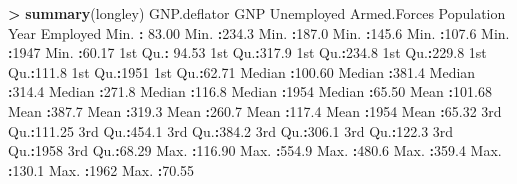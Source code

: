 \documentclass[]{book}
\newenvironment{Shaded}{\begin{snugshade}}{\end{snugshade}}
\newcommand{\KeywordTok}[1]{\textcolor[rgb]{0.13,0.29,0.53}{\textbf{#1}}}
\newcommand{\DecValTok}[1]{\textcolor[rgb]{0.00,0.00,0.81}{#1}}
\newcommand{\FloatTok}[1]{\textcolor[rgb]{0.00,0.00,0.81}{#1}}
\newcommand{\StringTok}[1]{\textcolor[rgb]{0.31,0.60,0.02}{#1}}
\newcommand{\OperatorTok}[1]{\textcolor[rgb]{0.81,0.36,0.00}{\textbf{#1}}}
\newcommand{\NormalTok}[1]{#1}
\begin{document}
\begin{Shaded}
\begin{Highlighting}[]
\OperatorTok{>}\StringTok{ }\KeywordTok{summary}\NormalTok{(longley)}
\NormalTok{  GNP.deflator         GNP          Unemployed     Armed.Forces     Population         Year         Employed    }
\NormalTok{ Min.   }\OperatorTok{:}\StringTok{ }\FloatTok{83.00}\NormalTok{   Min.   }\OperatorTok{:}\FloatTok{234.3}\NormalTok{   Min.   }\OperatorTok{:}\FloatTok{187.0}\NormalTok{   Min.   }\OperatorTok{:}\FloatTok{145.6}\NormalTok{   Min.   }\OperatorTok{:}\FloatTok{107.6}\NormalTok{   Min.   }\OperatorTok{:}\DecValTok{1947}\NormalTok{   Min.   }\OperatorTok{:}\FloatTok{60.17}  
\NormalTok{ 1st Qu.}\OperatorTok{:}\StringTok{ }\FloatTok{94.53}\NormalTok{   1st Qu.}\OperatorTok{:}\FloatTok{317.9}\NormalTok{   1st Qu.}\OperatorTok{:}\FloatTok{234.8}\NormalTok{   1st Qu.}\OperatorTok{:}\FloatTok{229.8}\NormalTok{   1st Qu.}\OperatorTok{:}\FloatTok{111.8}\NormalTok{   1st Qu.}\OperatorTok{:}\DecValTok{1951}\NormalTok{   1st Qu.}\OperatorTok{:}\FloatTok{62.71}  
\NormalTok{ Median }\OperatorTok{:}\FloatTok{100.60}\NormalTok{   Median }\OperatorTok{:}\FloatTok{381.4}\NormalTok{   Median }\OperatorTok{:}\FloatTok{314.4}\NormalTok{   Median }\OperatorTok{:}\FloatTok{271.8}\NormalTok{   Median }\OperatorTok{:}\FloatTok{116.8}\NormalTok{   Median }\OperatorTok{:}\DecValTok{1954}\NormalTok{   Median }\OperatorTok{:}\FloatTok{65.50}  
\NormalTok{ Mean   }\OperatorTok{:}\FloatTok{101.68}\NormalTok{   Mean   }\OperatorTok{:}\FloatTok{387.7}\NormalTok{   Mean   }\OperatorTok{:}\FloatTok{319.3}\NormalTok{   Mean   }\OperatorTok{:}\FloatTok{260.7}\NormalTok{   Mean   }\OperatorTok{:}\FloatTok{117.4}\NormalTok{   Mean   }\OperatorTok{:}\DecValTok{1954}\NormalTok{   Mean   }\OperatorTok{:}\FloatTok{65.32}  
\NormalTok{ 3rd Qu.}\OperatorTok{:}\FloatTok{111.25}\NormalTok{   3rd Qu.}\OperatorTok{:}\FloatTok{454.1}\NormalTok{   3rd Qu.}\OperatorTok{:}\FloatTok{384.2}\NormalTok{   3rd Qu.}\OperatorTok{:}\FloatTok{306.1}\NormalTok{   3rd Qu.}\OperatorTok{:}\FloatTok{122.3}\NormalTok{   3rd Qu.}\OperatorTok{:}\DecValTok{1958}\NormalTok{   3rd Qu.}\OperatorTok{:}\FloatTok{68.29}  
\NormalTok{ Max.   }\OperatorTok{:}\FloatTok{116.90}\NormalTok{   Max.   }\OperatorTok{:}\FloatTok{554.9}\NormalTok{   Max.   }\OperatorTok{:}\FloatTok{480.6}\NormalTok{   Max.   }\OperatorTok{:}\FloatTok{359.4}\NormalTok{   Max.   }\OperatorTok{:}\FloatTok{130.1}\NormalTok{   Max.   }\OperatorTok{:}\DecValTok{1962}\NormalTok{   Max.   }\OperatorTok{:}\FloatTok{70.55}  
\end{Highlighting}
\end{Shaded}
\end{document}
